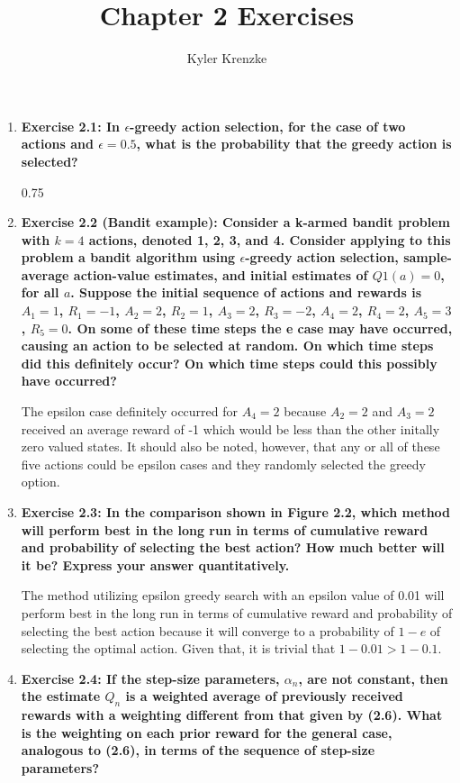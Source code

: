 \documentclass[11pt]{article}
\title{Chapter 2 Exercises}
\author{Kyler Krenzke}
\date{}
\begin{document}
	\maketitle

	\begin{enumerate}
		\item \textbf{Exercise 2.1: In $\epsilon$-greedy action selection, for the case of two actions and $\epsilon=0.5$, what is the probability that the greedy action is
		selected?}

		0.75
		
		\item \textbf{Exercise 2.2 (Bandit example): Consider a k-armed bandit problem with $k=4$ actions, denoted 1, 2, 3, and 4. Consider applying to this problem a bandit
		algorithm using $\epsilon$-greedy action selection, sample-average action-value estimates, and initial estimates of $Q1(a)=0$, for all $a$. Suppose the initial sequence of
		actions and rewards is $A_1=1$, $R_1=-1$, $A_2=2$, $R_2=1$, $A_3=2$, $R_3=-2$, $A_4=2$, $R_4=2$, $A_5=3$, $R_5=0$. On some of these time steps the e case may have occurred,
		causing an action to be selected at random. On which time steps did this definitely occur? On which time steps could this possibly have occurred?}

		The epsilon case definitely occurred for $A_4=2$ because $A_2=2$ and $A_3=2$ received an average reward of -1 which would be less than the other initally zero valued
		states. It should also be noted, however, that any or all of these five actions could be epsilon cases and they randomly selected the greedy option.
		
		\item \textbf{Exercise 2.3: In the comparison shown in Figure 2.2, which method will perform best in the long run in terms of cumulative reward and probability of
		selecting the best action? How much better will it be? Express your answer quantitatively.}
		
		The method utilizing epsilon greedy search with an epsilon value of 0.01 will perform best in the long run in terms of cumulative reward and probability of selecting the
		best action because it will converge to a probability of $1-e$ of selecting the optimal action. Given that, it is trivial that $1-0.01 > 1-0.1$.
		
		\item \textbf{Exercise 2.4: If the step-size parameters, $\alpha_n$, are not constant, then the estimate $Q_n$ is a weighted average of previously received rewards with a
		weighting different from that given by (2.6). What is the weighting on each prior reward for the general case, analogous to (2.6), in terms of the sequence of step-size
		parameters?}
		

\end{enumerate}
\end{document}
